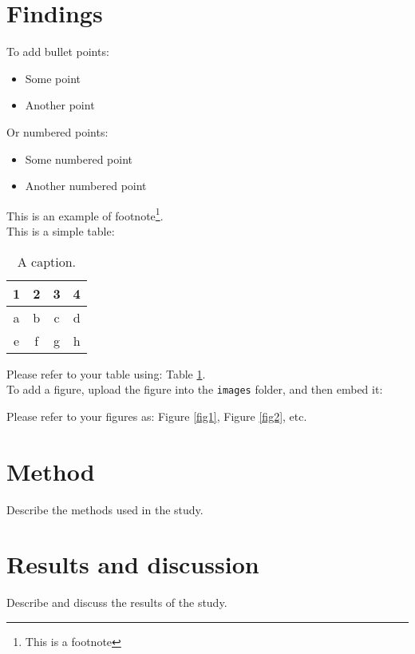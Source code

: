 \documentclass{article}
\begin{document}
\section{Findings}
To add bullet points:

\begin{itemize}
    \item Some point
    \item Another point
\end{itemize}

\noindent Or numbered points:

\begin{itemize}
    \item[1.] Some numbered point
    \item[2.] Another numbered point
\end{itemize}

\noindent This is an example of footnote\footnote{This is a footnote}. \\

\noindent This is a simple table:

\begin{table}[H]
\centering
\label{tab1} %
\caption{A caption.}
\begin{tabular}{cccc}
\hline
1 & 2 & 3 & 4 \\
\hline
a & b & c & d\\
e & f & g & h\\
\hline
\end{tabular}
\end{table}

\noindent Please refer to your table using: Table \ref{tab1}.\\

\noindent To add a figure, upload the figure into the \texttt{images} folder, and then embed it:

\noindent Please refer to your figures as: Figure \ref{fig1}, Figure \ref{fig2}, etc.

\section{Method}
Describe the methods used in the study.

\section{Results and discussion}
Describe and discuss the results of the study.


\theendnotes



\end{document}
